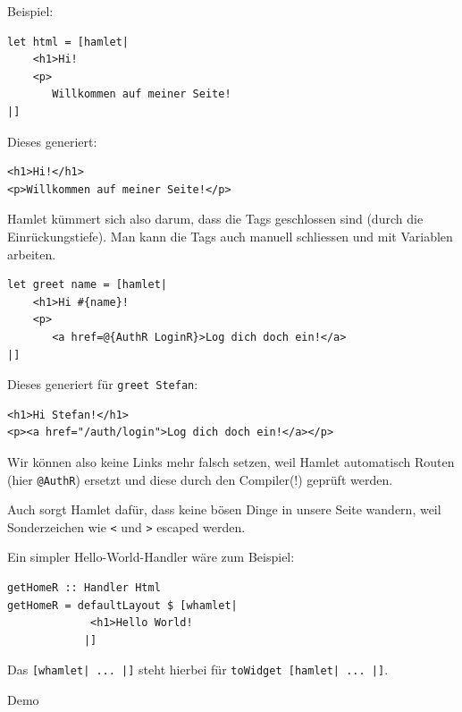 \documentclass{beamer}
\begin{document}
\begin{frame}[fragile]
Beispiel:\\\par
\begin{verbatim}
let html = [hamlet|
    <h1>Hi!
    <p>
       Willkommen auf meiner Seite!
|]
\end{verbatim}
\pause
Dieses generiert:
\begin{verbatim}
<h1>Hi!</h1>
<p>Willkommen auf meiner Seite!</p>
\end{verbatim}
\pause
Hamlet kümmert sich also darum, dass die Tags geschlossen sind (durch die Einrückungstiefe). Man kann die Tags auch manuell schliessen und mit Variablen arbeiten.
\end{frame}

\begin{frame}[fragile]
\begin{verbatim}
let greet name = [hamlet|
    <h1>Hi #{name}!
    <p>
       <a href=@{AuthR LoginR}>Log dich doch ein!</a>
|]
\end{verbatim}
\pause
Dieses generiert für \texttt{greet \glqq Stefan\grqq}:
\begin{verbatim}
<h1>Hi Stefan!</h1>
<p><a href="/auth/login">Log dich doch ein!</a></p>
\end{verbatim}
\pause
Wir können also keine Links mehr falsch setzen, weil Hamlet automatisch Routen (hier \texttt{@AuthR}) ersetzt und diese durch den Compiler(!) geprüft werden.\\\pause\par
Auch sorgt Hamlet dafür, dass keine bösen Dinge in unsere Seite wandern, weil Sonderzeichen wie \texttt{<} und \texttt{>} escaped werden.
\end{frame}

\begin{frame}[fragile]
Ein simpler Hello-World-Handler wäre zum Beispiel:
\bigskip

\begin{verbatim}
getHomeR :: Handler Html
getHomeR = defaultLayout $ [whamlet|
             <h1>Hello World!
            |]
\end{verbatim}
\pause
\bigskip

Das \texttt{[whamlet| ... |]} steht hierbei für \texttt{toWidget [hamlet| ... |]}.
\end{frame}

\begin{frame}
Demo
\end{frame}
\end{document}
